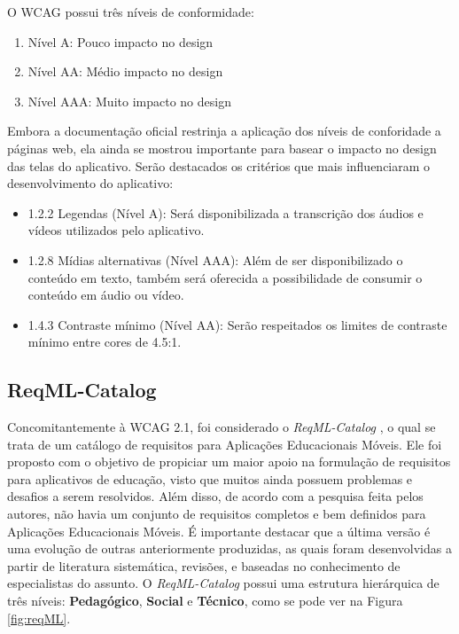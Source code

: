 O WCAG possui três níveis de conformidade:
\begin{enumerate}
    \item Nível A: Pouco impacto no design
    \item Nível AA: Médio impacto no design
    \item Nível AAA: Muito impacto no design
\end{enumerate}

Embora a documentação oficial restrinja a aplicação dos níveis de conforidade a páginas web, ela ainda se mostrou importante para basear o impacto no design das telas do aplicativo. 
Serão destacados os critérios que mais influenciaram o desenvolvimento do aplicativo:

\begin{itemize}
    \item 1.2.2 Legendas (Nível A): Será disponibilizada a transcrição dos áudios e vídeos utilizados pelo aplicativo.
    \item 1.2.8 Mídias alternativas (Nível AAA): Além de ser disponibilizado o conteúdo em texto, também será oferecida a possibilidade de consumir o conteúdo em áudio ou vídeo.
    \item 1.4.3 Contraste mínimo (Nível AA): Serão respeitados os limites de contraste mínimo entre cores de 4.5:1.
\end{itemize}


\subsection{ReqML-Catalog}
Concomitantemente à WCAG 2.1, foi considerado o \textit{ReqML-Catalog}
\citep{soad2017reqml}, o qual se trata de um catálogo de requisitos para Aplicações Educacionais Móveis. Ele foi proposto com o objetivo de propiciar um maior apoio na formulação de requisitos para aplicativos de educação, visto que muitos ainda possuem problemas e desafios a serem resolvidos. Além disso, de acordo com a pesquisa feita pelos autores, não havia um conjunto de requisitos completos e bem definidos para Aplicações Educacionais Móveis. É importante destacar que a última versão é uma evolução de outras anteriormente produzidas, as quais foram desenvolvidas a partir de literatura sistemática, revisões, e baseadas no conhecimento de especialistas do assunto. 
O \textit{ReqML-Catalog} possui uma estrutura hierárquica de três níveis: \textbf{Pedagógico}, \textbf{Social} e \textbf{Técnico}, como se pode ver na Figura \ref{fig:reqML}.

